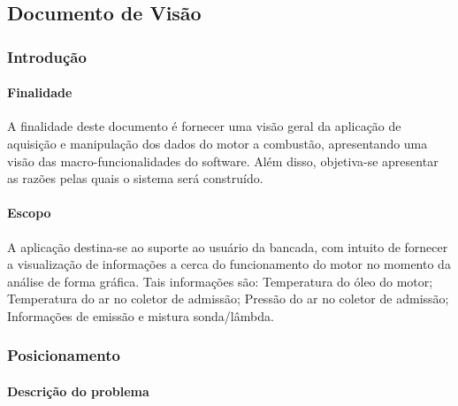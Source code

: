 \begin{anexosenv}

\partanexos

\chapter{Documento de Visão}

\subsection{Introdução}

\subsubsection{Finalidade}

A finalidade deste documento é fornecer uma visão geral da aplicação de aquisição e manipulação dos dados do motor a combustão, apresentando uma visão das macro-funcionalidades do software. Além disso, objetiva-se apresentar as razões pelas quais o sistema será construído.

\subsubsection{Escopo}

A aplicação destina-se ao suporte ao usuário da bancada, com intuito de fornecer a visualização de informações a cerca do funcionamento do motor no momento da análise de forma gráfica. Tais informações são: Temperatura do óleo do motor; Temperatura do ar no coletor de admissão; Pressão do ar no coletor de admissão; Informações de emissão e mistura sonda/lâmbda.

\subsection{Posicionamento}

\subsubsection{Descrição do problema}


\end{anexosenv}
